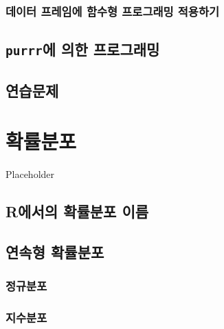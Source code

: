 \documentclass[
]{book}
\begin{document}
\hypertarget{uxb370uxc774uxd130-uxd504uxb808uxc784uxc5d0-uxd568uxc218uxd615-uxd504uxb85cuxadf8uxb798uxbc0d-uxc801uxc6a9uxd558uxae30}{%
\subsection{데이터 프레임에 함수형 프로그래밍 적용하기}\label{uxb370uxc774uxd130-uxd504uxb808uxc784uxc5d0-uxd568uxc218uxd615-uxd504uxb85cuxadf8uxb798uxbc0d-uxc801uxc6a9uxd558uxae30}}

\hypertarget{purrruxc5d0-uxc758uxd55c-uxd504uxb85cuxadf8uxb798uxbc0d}{%
\section{\texorpdfstring{\texttt{purrr}에 의한 프로그래밍}{purrr에 의한 프로그래밍}}\label{purrruxc5d0-uxc758uxd55c-uxd504uxb85cuxadf8uxb798uxbc0d}}

\hypertarget{uxc5f0uxc2b5uxbb38uxc81c-4}{%
\section{연습문제}\label{uxc5f0uxc2b5uxbb38uxc81c-4}}

\hypertarget{chapter-distribution}{%
\chapter{확률분포}\label{chapter-distribution}}

Placeholder

\hypertarget{ruxc5d0uxc11cuxc758-uxd655uxb960uxbd84uxd3ec-uxc774uxb984}{%
\section{R에서의 확률분포 이름}\label{ruxc5d0uxc11cuxc758-uxd655uxb960uxbd84uxd3ec-uxc774uxb984}}

\hypertarget{uxc5f0uxc18duxd615-uxd655uxb960uxbd84uxd3ec}{%
\section{연속형 확률분포}\label{uxc5f0uxc18duxd615-uxd655uxb960uxbd84uxd3ec}}

\hypertarget{uxc815uxaddcuxbd84uxd3ec}{%
\subsection{정규분포}\label{uxc815uxaddcuxbd84uxd3ec}}

\hypertarget{uxc9c0uxc218uxbd84uxd3ec}{%
\subsection{지수분포}\label{uxc9c0uxc218uxbd84uxd3ec}}
\end{document}
